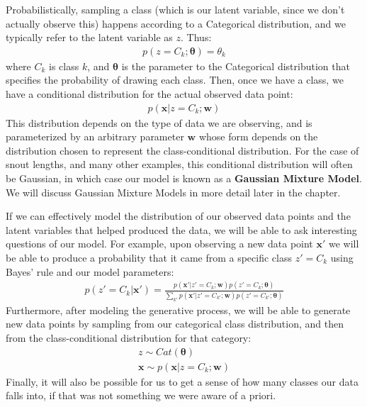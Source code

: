 Probabilistically, sampling a class (which is our latent variable, since we don't actually observe this) happens according to a Categorical distribution, and we typically refer to the latent variable as $z$. Thus:
\begin{align*}
    p(z = C_{k} ; \boldsymbol{\theta}) = \theta_{k}
\end{align*}
where $C_{k}$ is class $k$, and $\boldsymbol{\theta}$ is the parameter to the Categorical distribution that specifies the probability of drawing each class. Then, once we have a class, we have a conditional distribution for the actual observed data point:
\begin{align*}
    p(\textbf{x} | z = C_{k}; \textbf{w})
\end{align*}
This distribution depends on the type of data we are observing, and is parameterized by an arbitrary parameter $\textbf{w}$ whose form depends on the distribution chosen to represent the class-conditional distribution. For the case of snout lengths, and many other examples, this conditional distribution will often be Gaussian, in which case our model is known as a \textbf{Gaussian Mixture Model}. We will discuss Gaussian Mixture Models in more detail later in the chapter.

If we can effectively model the distribution of our observed data points and the latent variables that helped produced the data, we will be able to ask interesting questions of our model. For example, upon observing a new data point $\textbf{x}'$ we will be able to produce a probability that it came from a specific class $z' = C_k$ using Bayes' rule and our model parameters:
\begin{align*}
    p(z' = C_k | \textbf{x}') = \frac{p(\textbf{x}' | z' = C_{k}; \textbf{w})p(z' = C_{k} ; \boldsymbol{\theta})}{\sum_{k'} p(\textbf{x}' | z' = C_{k'}; \textbf{w})p(z' = C_{k'} ; \boldsymbol{\theta})}
\end{align*}
Furthermore, after modeling the generative process, we will be able to generate new data points by sampling from our categorical class distribution, and then from the class-conditional distribution for that category:
\begin{align*}
    z \sim Cat(\boldsymbol{\theta}) \\
    \textbf{x} \sim p(\textbf{x} | z = C_{k}; \textbf{w})
\end{align*}
Finally, it will also be possible for us to get a sense of how many classes our data falls into, if that was not something we were aware of a priori.

